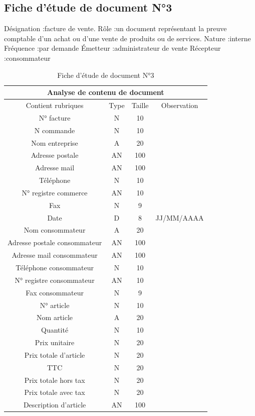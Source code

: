 \documentclass[edit,12pt,a4paper,ChapStyle,oneside,doubleinterligne]{report}
\begin{document}
\newpage
\subsection{Fiche d’étude de document N°3}
Désignation :facture de vente.
\newline Rôle :un document représentant la preuve comptable d'un achat ou d'une vente de produits ou de services.
\newline Nature :interne
\newline Fréquence :par demande
\newline Émetteur :administrateur de vente
\newline Récepteur :consommateur \cite{facturev}
\begin{table}[h!]
    \centering
    \begin{tabular}{|c|c|c|c|}
         \hline
\multicolumn{4}{|c|}{Analyse de contenu de document}\\
\hline
Contient rubriques & Type & Taille & Observation\\
\hline
 N° facture  & N & 10 & \\
 N commande  & N & 10 & \\
 Nom entreprise & A & 20 & \\
 Adresse postale & AN & 100 & \\
 Adresse mail & AN & 100 & \\
 Téléphone & N & 10 & \\
 N° registre commerce & AN & 10 & \\
 Fax & N & 9 & \\
Date & D & 8 & JJ/MM/AAAA \\
Nom consommateur & A & 20 & \\
Adresse postale consommateur & AN & 100 & \\
Adresse mail consommateur & AN & 100 & \\
Téléphone consommateur & N & 10 & \\
N° registre consommateur & AN & 10 & \\
Fax consommateur & N & 9 & \\
N° article & N & 10 & \\
Nom article & A & 20 & \\
Quantité & N & 10 & \\
Prix unitaire & N & 20 & \\
Prix totale d’article & N & 20 & \\
TTC & N & 20 & \\
Prix totale hors tax & N & 20 & \\
Prix totale avec tax & N & 20 & \\
Description d’article & AN & 100 & \\
\hline
    \end{tabular}
    \caption{Fiche d’étude de document N°3}
    \label{tab:3}
\end{table}
\end{document}
